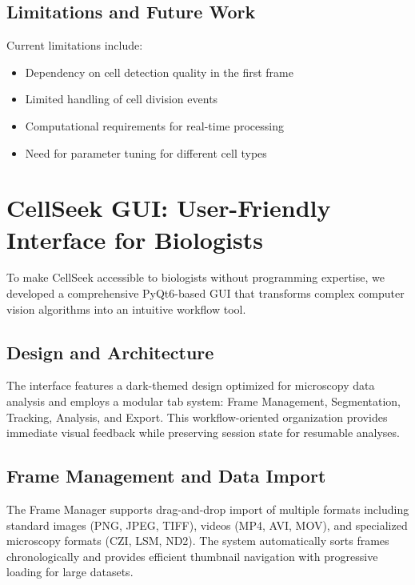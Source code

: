 \documentclass[12pt]{article}
\begin{document}
\subsection{Limitations and Future Work}

Current limitations include:
\begin{itemize}
  \item Dependency on cell detection quality in the first frame
  \item Limited handling of cell division events
  \item Computational requirements for real-time processing
  \item Need for parameter tuning for different cell types
\end{itemize}

\section{CellSeek GUI: User-Friendly Interface for Biologists}


To make CellSeek accessible to biologists without programming expertise, we developed a comprehensive PyQt6-based GUI that transforms complex computer vision algorithms into an intuitive workflow tool.

\subsection{Design and Architecture}

The interface features a dark-themed design optimized for microscopy data analysis and employs a modular tab system: Frame Management, Segmentation, Tracking, Analysis, and Export. This workflow-oriented organization provides immediate visual feedback while preserving session state for resumable analyses.

\subsection{Frame Management and Data Import}

The Frame Manager supports drag-and-drop import of multiple formats including standard images (PNG, JPEG, TIFF), videos (MP4, AVI, MOV), and specialized microscopy formats (CZI, LSM, ND2). The system automatically sorts frames chronologically and provides efficient thumbnail navigation with progressive loading for large datasets.
\end{document}
